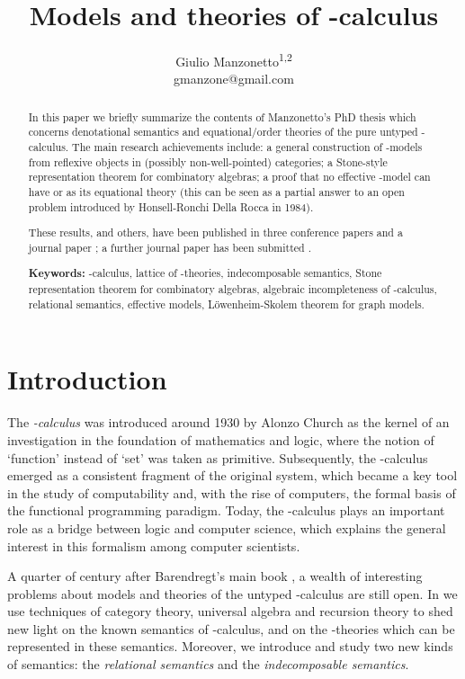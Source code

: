 \documentclass[english]{llncs}
\title{Models and theories of -calculus}
\author{Giulio Manzonetto\textsuperscript{1,2}\\
        gmanzone@gmail.com
}
\institute{Laboratoire PPS, Universit\'{e} Paris 7,\\
2, place Jussieu (case 7014), 75251 Paris Cedex 05, France
\and
Universit\`a Ca Foscari di Venezia,\\
Dipartimento di Informatica
Via Torino 155,
Venezia, Italy
}
\begin{document}
\maketitle

\begin{abstract}
In this paper we briefly summarize the contents of Manzonetto's PhD thesis \cite{ManzonettoTh}
which concerns denotational semantics and equational/order theories of the pure untyped -calculus.
The main research achievements include: 
 a general construction of -models from reflexive objects in (possibly non-well-pointed) categories;
 a Stone-style representation theorem for combinatory algebras; 
 a proof that no effective -model can have  or  as its equational theory 
(this can be seen as a partial answer to an open problem introduced by Honsell-Ronchi Della Rocca in 1984). 

These results, and others, have been published in three conference papers \cite{ManzonettoS06,BerlineMS07,BucciarelliEM07} and 
a journal paper \cite{ManzonettoS08}; a further journal paper has been submitted \cite{BerlineMS08}.

\medskip

{\bf Keywords:} -calculus, lattice of -theories, indecomposable semantics, Stone representation theorem for combinatory algebras,
algebraic incompleteness of -calculus, relational semantics, effective models, L\"owenheim-Skolem theorem for graph models.
\end{abstract}



\section*{Introduction}

The \emph{-calculus} \cite{Church32} was introduced around 1930 by Alonzo Church as the kernel of an investigation in the foundation of mathematics and logic,
where the notion of `function' instead of `set' was taken as primitive.
Subsequently, the -calculus emerged as a consistent fragment of the original system, which became a key tool in the study of computability and, 
with the rise of computers, the formal basis of the functional programming paradigm.
Today, the -calculus plays an important role as a bridge between logic and computer science, which explains the general interest in this formalism 
among computer scientists.

A quarter of century after Barendregt's main book \cite{Bare}, a wealth of interesting problems about models and theories of the untyped -calculus are still open.
In \cite{ManzonettoTh} we use techniques of category theory, universal algebra and recursion theory to shed new light on the known semantics of -calculus,
and on the -theories which can be represented in these semantics. 
Moreover, we introduce and study two new kinds of semantics: the \emph{relational semantics} and the \emph{in\-de\-com\-po\-sable semantics}.
\end{document}
